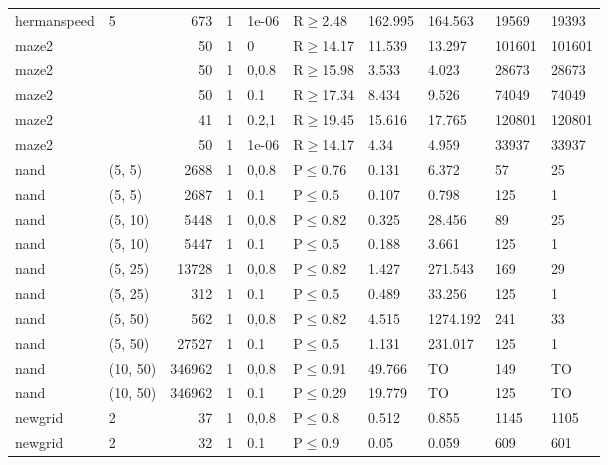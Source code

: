 \begin{longtable}{llrrllllll}
 hermanspeed   & 5        &    	673 & 1 & 1e-06 & R$\geq$2.48  & 162.995 & 164.563  & 19569  & 19393  \\
 maze2         &          &     	50 & 1 & 0     & R$\geq$14.17 & 11.539  & 13.297   & 101601 & 101601 \\
 maze2         &          &     	50 & 1 & 0,0.8 & R$\geq$15.98 & 3.533   & 4.023    & 28673  & 28673  \\
 maze2         &          &     	50 & 1 & 0.1   & R$\geq$17.34 & 8.434   & 9.526    & 74049  & 74049  \\
 maze2         &          &     	41 & 1 & 0.2,1 & R$\geq$19.45 & 15.616  & 17.765   & 120801 & 120801 \\
 maze2         &          &     	50 & 1 & 1e-06 & R$\geq$14.17 & 4.34    & 4.959    & 33937  & 33937  \\
 nand          & (5, 5)   &   	2688 & 1 & 0,0.8 & P$\leq$0.76  & 0.131   & 6.372    & 57     & 25     \\
 nand          & (5, 5)   &   	2687 & 1 & 0.1   & P$\leq$0.5   & 0.107   & 0.798    & 125    & 1      \\
 nand          & (5, 10)  &   	5448 & 1 & 0,0.8 & P$\leq$0.82  & 0.325   & 28.456   & 89     & 25     \\
 nand          & (5, 10)  &   	5447 & 1 & 0.1   & P$\leq$0.5   & 0.188   & 3.661    & 125    & 1      \\
 nand          & (5, 25)  &  	13728 & 1 & 0,0.8 & P$\leq$0.82  & 1.427   & 271.543  & 169    & 29     \\
 nand          & (5, 25)  &    	312 & 1 & 0.1   & P$\leq$0.5   & 0.489   & 33.256   & 125    & 1      \\
 nand          & (5, 50)  &    	562 & 1 & 0,0.8 & P$\leq$0.82  & 4.515   & 1274.192 & 241    & 33     \\
 nand          & (5, 50)  &  	27527 & 1 & 0.1   & P$\leq$0.5   & 1.131   & 231.017  & 125    & 1      \\
 nand          & (10, 50) & 	346962 & 1 & 0,0.8 & P$\leq$0.91  & 49.766  & TO       & 149    & TO     \\
 nand          & (10, 50) & 	346962 & 1 & 0.1   & P$\leq$0.29  & 19.779  & TO       & 125    & TO     \\
 newgrid       & 2        &     	37 & 1 & 0,0.8 & P$\leq$0.8   & 0.512   & 0.855    & 1145   & 1105   \\
 newgrid       & 2        &     	32 & 1 & 0.1   & P$\leq$0.9   & 0.05    & 0.059    & 609    & 601    \\

\end{longtable}
